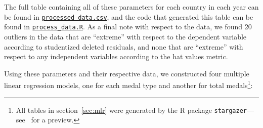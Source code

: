 \documentclass{mcmthesis}
\begin{document}
The full table containing all of these parameters for each country in each year can be found in \href{https://github.com/YanxiangShan/MCM-2524908/blob/main/code/MLR/processed_data.csv}{\texttt{processed\_data.csv}}, and the code that generated this table can be found in \href{https://github.com/YanxiangShan/MCM-2524908/blob/main/code/MLR/process_data.R}{\texttt{process\_data.R}}. As a final note with respect to the data, we found 20 outliers in the data that are \enquote{extreme} with respect to the dependent variable according to studentized deleted residuals, and none that are \enquote{extreme} with respect to any independent variables according to the hat values metric.

Using these parameters and their respective data, we constructed four multiple linear regression models, one for each medal type and another for total medals\footnote{
    All tables in section~\ref{sec:mlr} were generated by the R package \texttt{stargazer}---see~\cite{hlavac2022stargazer} for a preview.
}:
\end{document}
